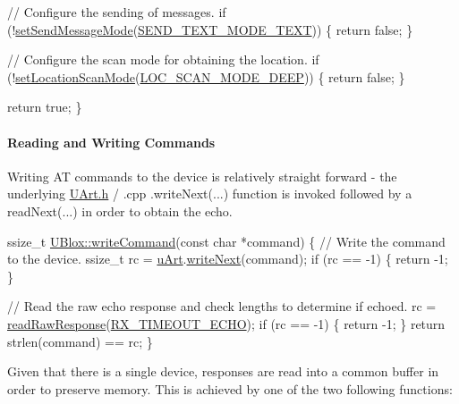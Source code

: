 \begin{DoxyCode}
    \textcolor{comment}{// Configure the sending of messages.}
    \textcolor{keywordflow}{if} (!\hyperlink{class_u_blox_a12c1042d3bcb503b025927fd53d54243}{setSendMessageMode}(\hyperlink{_u_blox_8h_a4fdc1adf2ea333d6490119160a35401a}{SEND\_TEXT\_MODE\_TEXT})) \{
        \textcolor{keywordflow}{return} \textcolor{keyword}{false};
    \}

    \textcolor{comment}{// Configure the scan mode for obtaining the location.}
    \textcolor{keywordflow}{if} (!\hyperlink{class_u_blox_aabed44fd41e16c9d1a8daba80f3bef06}{setLocationScanMode}(\hyperlink{_u_blox_8h_a5c819e4d40995d2854dc0e2cddd7ddef}{LOC\_SCAN\_MODE\_DEEP})) \{
        \textcolor{keywordflow}{return} \textcolor{keyword}{false};
    \}

    \textcolor{keywordflow}{return} \textcolor{keyword}{true};
\}
\end{DoxyCode}
 \paragraph*{Reading and Writing Commands}

Writing AT commands to the device is relatively straight forward -\/ the underlying \hyperlink{_u_art_8h}{U\+Art.\+h} / .cpp \textquotesingle{}.write\+Next(...)\textquotesingle{} function is invoked followed by a \textquotesingle{}read\+Next(...)\textquotesingle{} in order to obtain the echo.


\begin{DoxyCode}
ssize\_t \hyperlink{class_u_blox_af604d1897a66192bf1c2a11997f2634d}{UBlox::writeCommand}(\textcolor{keyword}{const} \textcolor{keywordtype}{char} *command)
\{
    \textcolor{comment}{// Write the command to the device.}
    ssize\_t rc = \hyperlink{class_u_blox_a034c0463d1c199d094d657c8ebb151e8}{uArt}.\hyperlink{class_u_art_aad1ddb133fe430a92527584eec2e674f}{writeNext}(command);
    \textcolor{keywordflow}{if} (rc == -1) \{
        \textcolor{keywordflow}{return} -1;
    \}

    \textcolor{comment}{// Read the raw echo response and check lengths to determine if echoed.}
    rc = \hyperlink{class_u_blox_ab4a7ab4b8922d91e23f273ae160c1bed}{readRawResponse}(\hyperlink{_u_blox_8cpp_a55092c0742d15bb08a5ea7db5a25440e}{RX\_TIMEOUT\_ECHO});
    \textcolor{keywordflow}{if} (rc == -1) \{
        \textcolor{keywordflow}{return} -1;
    \}
    \textcolor{keywordflow}{return} strlen(command) == rc;
\}
\end{DoxyCode}


Given that there is a single device, responses are read into a common buffer in order to preserve memory. This is achieved by one of the two following functions\+:


